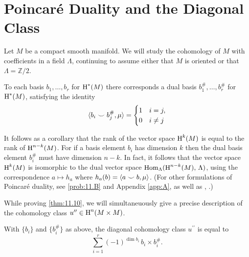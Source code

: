 \documentclass[../main]{subfiles}
\begin{document}
\section{Poincaré Duality and the Diagonal Class}


Let $M$ be a compact smooth manifold. We will study the cohomology of $M$ with coefficients in a field $\Lambda$, continuing to assume either that $M$ is oriented or that $\Lambda=\mathbb{Z} / 2$. 

\begin{theorem}
\label{thm:11.10}
To each basis $b_1, \dots, b_r$ for $\operatorname{H}^\ast(M)$ there corresponds a dual basis $b_1^\#, \dots, b_r^\#$ for $\operatorname{H}^\ast(M)$, satisfying the identity
\[
\langle b_i\smile b_j^\#,\mu\rangle =\begin{cases} 1 & i=j,\\0 &i\neq j\end{cases}
\]
\end{theorem}

It follows as a corollary that the rank of the vector space $\operatorname{H}^k(M)$ is equal to the rank of $\operatorname{H}^{n-k}(M)$. For if a basis element $b_i$ has dimension $k$ then the dual basis element $b_i^\#$ must have dimension $n-k$. In fact, it follows that the vector space $\operatorname{H}^k(M)$ is isomorphic to the dual vector space $\operatorname{Hom}_\Lambda(\operatorname{H}^{n-k}(M),\,\Lambda)$, using the correspondence $a\mapsto h_a$ where $h_a(b) = \langle a\smile b,\mu\rangle$. (For other formulations of Poincaré duality, see \ref{prob:11.B} and Appendix \ref{app:A}, as well as \cite{spanier1981}, \cite{dold1972}.)

While proving \ref{thm:11.10}, we will simultaneuously give a precise description of the cohomology class $u^{\prime\prime}\in\operatorname{H}^n(M\times M)$. 

\begin{theorem}
\label{thm:11.11}
With $\{b_i\}$ and $\{b_i^\#\}$ as above, the diagonal cohomology class $u^{\prime\prime}$ is equal to
\[
\sum^r_{i=1} (-1)^{\dim{b_i}} \, b_i\times b_i^\#.
\]
\end{theorem}
\end{document}
